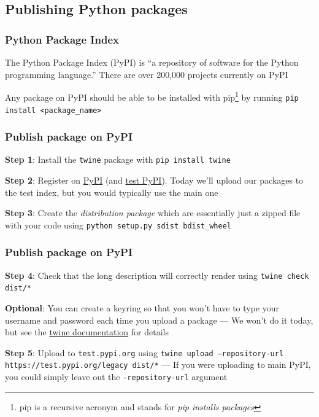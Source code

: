 \documentclass[10pt]{beamer}
\begin{document}
  \subsection{Publishing Python packages}

  \begin{frame} \frametitle{Python Package Index}

    The Python Package Index (PyPI) is ``a repository of software for the Python programming
    language.'' There are over 200,000 projects currently on PyPI

    \vspace{0.3cm}

    Any package on PyPI should be able to be installed with pip\footnote{pip is a recursive
    acronym and stands for \textit{pip installs packages}} by running
    \texttt{pip install <package\_name>}

  \end{frame}

  \begin{frame} \frametitle{Publish package on PyPI}

    \textbf{Step 1}: Install the \texttt{twine} package with \texttt{pip install twine}

    \vspace{0.25cm}

    \textbf{Step 2}: Register on \href{https://pypi.org/account/register/}{PyPI} (and
    \href{https://test.pypi.org/account/register/}{test PyPI}). Today we'll upload our
    packages to the test index, but you would typically use the main one

    \vspace{0.25cm}

    \textbf{Step 3}: Create the \textit{distribution package} which are essentially just
    a zipped file with your code using \texttt{python setup.py sdist bdist\_wheel}

  \end{frame}

  \begin{frame} \frametitle{Publish package on PyPI}

    \textbf{Step 4}: Check that the long description will correctly render using
    \texttt{twine check dist/*}

    \vspace{0.25cm}

    \textbf{Optional}: You can create a keyring so that you won't have to type your
    username and password each time you upload a package --- We won't do it today, but
    see the \href{https://github.com/pypa/twine\#keyring-support}{twine documentation}
    for details

    \vspace{0.25cm}

    \textbf{Step 5}: Upload to \texttt{test.pypi.org} using
    \texttt{twine upload --repository-url https://test.pypi.org/legacy dist/*} --- If
    you were uploading to main PyPI, you could simply leave out the
    \texttt{-repository-url} argument

  \end{frame}
\end{document}

